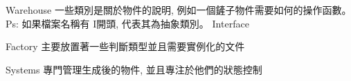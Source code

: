 
\begin{DoxyItemize}
\item Warehouse 一些類別是關於物件的說明, 例如一個鏟子物件需要如何的操作函數。 Ps\+: 如果檔案名稱有 \textquotesingle{}I\textquotesingle{}開頭, 代表其為抽象類別。 Interface
\item Factory 主要放置著一些判斷類型並且需要實例化的文件
\item Systems 專門管理生成後的物件, 並且專注於他們的狀態控制 
\end{DoxyItemize}